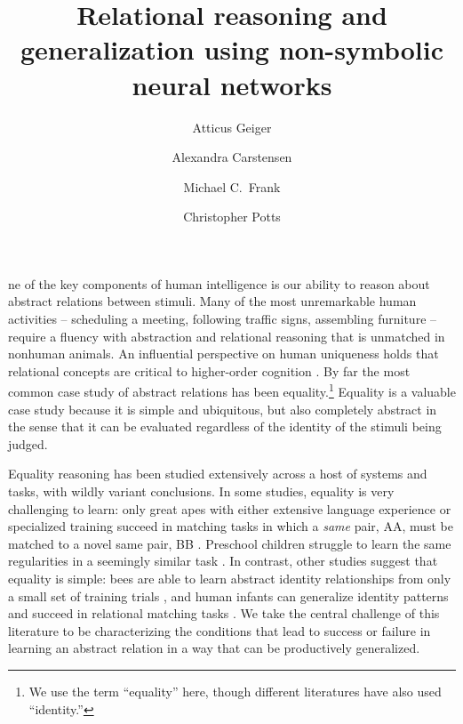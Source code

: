 \documentclass[9pt,twocolumn,twoside,lineno]{pnas-new}
\title{Relational reasoning and generalization using non-symbolic neural networks}
\author[a]{Atticus Geiger}
\author[b]{Alexandra Carstensen}
\author[b]{Michael C.~Frank}
\author[a]{Christopher Potts}
\affil[a]{Department of Linguistics, Stanford University}
\affil[b]{Department of Psychology, Stanford University}
\newcommand{\updateb}[1]{{\color{ourgreen}#1}}
\begin{document}
\maketitle
\thispagestyle{firststyle}



ne of the key components of human intelligence is our ability to reason about abstract relations between stimuli. Many of the most unremarkable human activities -- scheduling a meeting, following traffic signs, assembling furniture -- require a fluency with abstraction and relational reasoning that is unmatched in nonhuman animals. An influential perspective on human uniqueness holds that relational concepts are critical to higher-order cognition \citep[e.g.,][]{Gentner:2003}. By far the most common case study of abstract relations has been equality.\footnote{We use the term ``equality'' here, though different literatures have also used ``identity.''} Equality is a valuable case study because it is simple and ubiquitous, but also completely abstract in the sense that it can be evaluated regardless of the identity of the stimuli being judged.

Equality reasoning has been studied extensively across a host of systems and tasks, with wildly variant conclusions. In some studies, equality is very challenging to learn: only great apes with either extensive language experience or specialized training succeed in matching tasks in which a \emph{same} pair, AA, must be matched to a novel same pair, BB \cite{Premack:1983,thompson:2001}. Preschool children struggle to learn the same regularities in a seemingly similar task \cite{walker:2016}. In contrast, other studies suggest that equality is simple: bees are able to learn abstract identity relationships from only a small set of training trials \cite{avargues:2011}, \updateb{and human infants can generalize identity patterns \cite{anderson:2018} and succeed in relational matching tasks \cite{ferry:2015}.} We take the central challenge of this literature to be characterizing the conditions that lead to success or failure in learning an abstract relation in a way that can be productively generalized.
\end{document}
